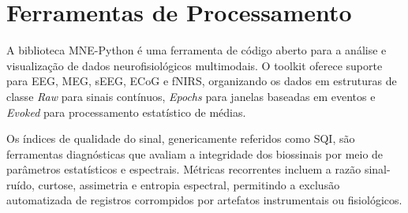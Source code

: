 \section{Ferramentas de Processamento}

A biblioteca MNE-Python é uma ferramenta de código aberto para a análise e visualização de dados neurofisiológicos multimodais. O toolkit oferece suporte para EEG, MEG, sEEG, ECoG e fNIRS, organizando os dados em estruturas de classe \textit{Raw} para sinais contínuos, \textit{Epochs} para janelas baseadas em eventos e \textit{Evoked} para processamento estatístico de médias.

Os índices de qualidade do sinal, genericamente referidos como SQI, são ferramentas diagnósticas que avaliam a integridade dos biossinais por meio de parâmetros estatísticos e espectrais. Métricas recorrentes incluem a razão sinal-ruído, curtose, assimetria e entropia espectral, permitindo a exclusão automatizada de registros corrompidos por artefatos instrumentais ou fisiológicos.

